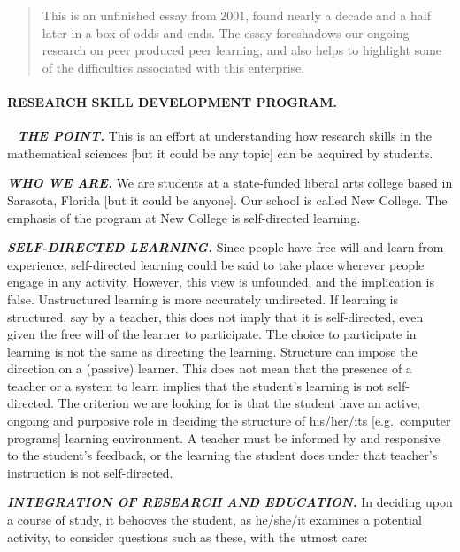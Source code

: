 \begin{quote}
This is an unfinished essay from 2001, found nearly a decade and a half
later in a box of odds and ends. The essay foreshadows our ongoing
research on peer produced peer learning, and also helps to highlight
some of the difficulties associated with this enterprise.
\end{quote}

\paragraph{RESEARCH SKILL DEVELOPMENT PROGRAM.}\label{research-skill-development-program}
~\newline
\noindent\emph{\textbf{THE POINT.}} This is an effort at understanding how research
skills in the mathematical sciences {[}but it could be any topic{]} can
be acquired by students.

\noindent\emph{\textbf{WHO WE ARE.}} We are students at a state-funded liberal arts
college based in Sarasota, Florida {[}but it could be anyone{]}. Our
school is called New College. The emphasis of the program at New College
is self-directed learning.

\noindent\emph{\textbf{SELF-DIRECTED LEARNING.}} Since people have free will and learn
from experience, self-directed learning could be said to take place
wherever people engage in any activity. However, this view is unfounded,
and the implication is false. Unstructured learning is more accurately
undirected. If learning is structured, say by a teacher, this does not
imply that it is self-directed, even given the free will of the learner
to participate. The choice to participate in learning is not the same as
directing the learning. Structure can impose the direction on a
(passive) learner. This does not mean that the presence of a teacher or
a system to learn implies that the student's learning is not
self-directed. The criterion we are looking for is that the student have
an active, ongoing and purposive role in deciding the structure of
his/her/its {[}e.g.~computer programs{]} learning
environment. A teacher must be informed by and responsive to the
student's feedback, or the learning the student does under that
teacher's instruction is not self-directed.

\noindent\emph{\textbf{INTEGRATION OF RESEARCH AND EDUCATION.}} In deciding upon a
course of study, it behooves the student, as he/she/it examines a
potential activity, to consider questions such as these, with the utmost
care:

